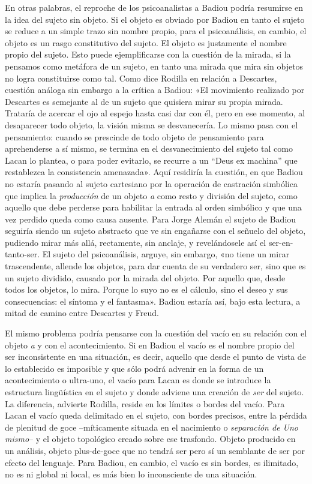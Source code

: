 En otras palabras, el reproche de los psicoanalistas a Badiou podría resumirse en la idea del sujeto sin objeto. Si el objeto es obviado por Badiou en tanto el sujeto se reduce a un simple trazo sin nombre propio, para el psicoanálisis, en cambio, el objeto es un rasgo constitutivo del sujeto. El objeto es justamente el nombre propio del sujeto. Esto puede ejemplificarse con la cuestión de la mirada, si la pensamos como metáfora de un sujeto, en tanto una mirada que mira sin objetos no logra constituirse como tal. Como dice Rodilla en relación a Descartes, cuestión análoga sin embargo a la crítica a Badiou: «El movimiento realizado por Descartes es semejante al de un sujeto que quisiera mirar su propia mirada. Trataría de acercar el ojo al espejo hasta casi dar con él, pero en ese momento, al desaparecer todo objeto, la visión misma se desvanecería. Lo mismo pasa con el pensamiento: cuando se prescinde de todo objeto de pensamiento para aprehenderse a sí mismo, se termina en el desvanecimiento del sujeto tal como Lacan lo plantea, o para poder evitarlo, se recurre a un ``Deus ex machina'' que restablezca la consistencia amenazada». Aquí residiría la cuestión, en que Badiou no estaría pasando al sujeto cartesiano por la operación de castración simbólica que implica la \emph{producción} de un objeto \emph{a} como resto y división del sujeto, como aquello que debe perderse para habilitar la entrada al orden simbólico y que una vez perdido queda como causa ausente. Para Jorge Alemán el sujeto de Badiou seguiría siendo un sujeto abstracto que ve sin engañarse con el señuelo del objeto, pudiendo mirar más allá, rectamente, sin anclaje, y revelándosele así el ser-en-tanto-ser. El sujeto del psicoanálisis, arguye, sin embargo, «no tiene un mirar trascendente, allende los objetos, para dar cuenta de su verdadero ser, sino que es un sujeto dividido, causado por la mirada del objeto. Por aquello que, desde todos los objetos, lo mira. Porque lo suyo no es el cálculo, sino el deseo y sus consecuencias: el síntoma y el fantasma». Badiou estaría así, bajo esta lectura, a mitad de camino entre Descartes y Freud.

El mismo problema podría pensarse con la cuestión del vacío en su relación con el objeto \emph{a} y con el acontecimiento. Si en Badiou el vacío es el nombre propio del ser inconsistente en una situación, es decir, aquello que desde el punto de vista de lo establecido es imposible y que sólo podrá advenir en la forma de un acontecimiento o ultra-uno, el vacío para Lacan es donde se introduce la estructura lingüística en el sujeto y donde adviene una creación de \emph{ser} del sujeto. La diferencia, advierte Rodilla, reside en los límites o bordes del vacío. Para Lacan el vacío queda delimitado en el sujeto, con bordes precisos, entre la pérdida de plenitud de goce --míticamente situada en el nacimiento o \emph{separación de Uno mismo}-- y el objeto topológico creado sobre ese trasfondo. Objeto producido en un análisis, objeto plus-de-goce que no tendrá ser pero sí un semblante de ser por efecto del lenguaje. Para Badiou, en cambio, el vacío es sin bordes, es ilimitado, no es ni global ni local, es más bien lo inconsciente de una situación.

